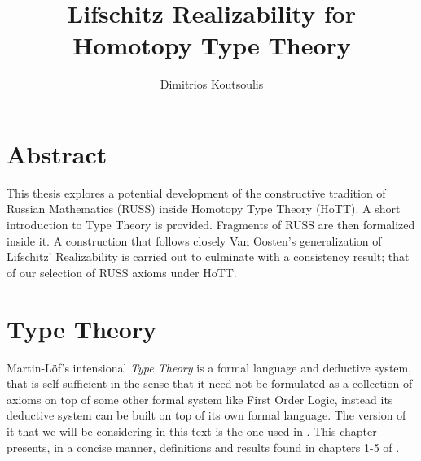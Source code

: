 \documentclass[12pt]{report}
\theoremstyle{definition}
\begin{document}
 
\title{Lifschitz Realizability for Homotopy Type Theory}%
\author{Dimitrios Koutsoulis} %

{\parskip=0pt
\maketitle}
\chapter*{Abstract}
This thesis explores a potential development of the constructive tradition of Russian Mathematics (RUSS) inside Homotopy Type Theory (HoTT). 
A short introduction to Type Theory is provided. 
Fragments of RUSS are then formalized inside it. 
A construction that follows closely Van Oosten's generalization of Lifschitz' Realizability is carried out to culminate with a consistency result; that of our selection of RUSS axioms under HoTT. 

\chapter{Type Theory}
Martin-L\"of's intensional \textit{Type Theory} is a formal language and deductive system, that is self sufficient in the sense that it need not be formulated as a collection of axioms on top of some other formal system like First Order Logic, instead its deductive system can be built on top of its own formal language. 
The version of it that we will be considering in this text is the one used in \cite{hottbook}. 
This chapter presents, in a concise manner, definitions and results found in chapters 1-5 of \cite{hottbook}. 
\end{document}
